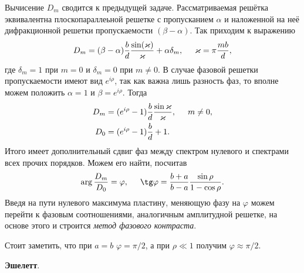 Вычисение $D_m$ сводится к предыдущей задаче. Рассматриваемая решётка эквивалентна плоскопараллеьной решетке с пропусканием $\alpha$ и наложенной на неё дифракционной решетки пропускаемости $(\beta-\alpha)$. Так приходим к выражению
\begin{equation*}
    D_m = (\beta-\alpha) \frac{b}{d} \frac{\sin(\varkappa)}{\varkappa} + \alpha \delta_m, \hspace{5 mm} 
    \varkappa = \pi \frac{ m b}{d},
\end{equation*}
где $\delta_m = 1$ при $m=0$ и $\delta_m = 0$ при $m \neq 0$. В случае фазовой решетки пропускаемости имеют вид $e^{i \rho}$, так как важна лишь разность фаз, то вполне можем положить $\alpha=1$ и $\beta=e^{i \rho}$. Тогда
\begin{align*}
    D_m &= (e^{i \rho}-1) \frac{b}{d} \frac{\sin\varkappa}{\varkappa}, \hspace{5 mm} m \neq 0, \\
    D_0 &= (e^{i \rho} -1) \frac{b}{d} + 1.
\end{align*}
Итого имеет дополнительный сдвиг фаз между спектром нулевого и спектрами всех прочих порядков. Можем его найти, посчитав
\begin{equation*}
    \arg \frac{D_m}{D_0} = \varphi, \hspace{5 mm} \tg \varphi = \frac{b+a}{b-a} \frac{\sin \rho}{1-\cos \rho}.
\end{equation*}
Введя на пути нулевого максимума пластину, меняющую фазу на $\varphi$ можем перейти к фазовым соотношениями, аналогичным амплитудной решетке, на основе этого и строится \textit{метод фазового контраста}. 

Стоит заметить, что при $a=b$ $\varphi =\pi/2$, а при $\rho \ll 1$  получим $\varphi \approx \pi/2$. 


\textbf{Эшелетт}. 


